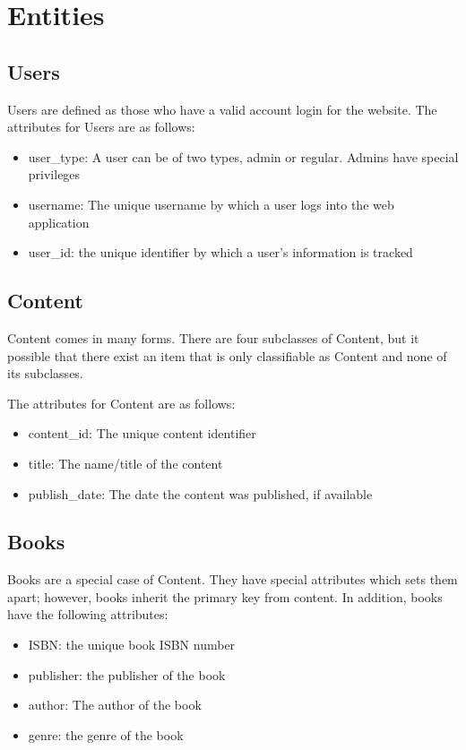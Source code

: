 \documentclass[letter, 12pt, titlepage]{article}
\begin{document}
	\section{Entities}
		\subsection{Users}
			Users are defined as those who have a valid account login for the website.
			The attributes for Users are as follows:
			\begin{itemize}
				\item user\_type: A user can be of two types, admin or regular. Admins have special privileges
				\item username: The unique username by which a user logs into the web application
				\item user\_id: the unique identifier by which a user's information is tracked
			\end{itemize}
		\subsection{Content}
				Content comes in many forms. There are four subclasses of Content, but it possible that there exist an item that is only classifiable as Content and none of its subclasses. 
			
				The attributes for Content are as follows:
			\begin{itemize}
				\item content\_id: The unique content identifier
				\item title: The name/title of the content
				\item publish\_date: The date the content was published, if available
			\end{itemize}
			\subsection{Books}
				Books are a special case of Content. They have special attributes which sets them apart; however, books inherit the primary key from content. In addition, books have the following attributes:
			\begin{itemize}
				\item ISBN: the unique book ISBN number
				\item publisher: the publisher of the book
				\item author: The author of the book
				\item genre: the genre of the book
			\end{itemize}
\end{document}
